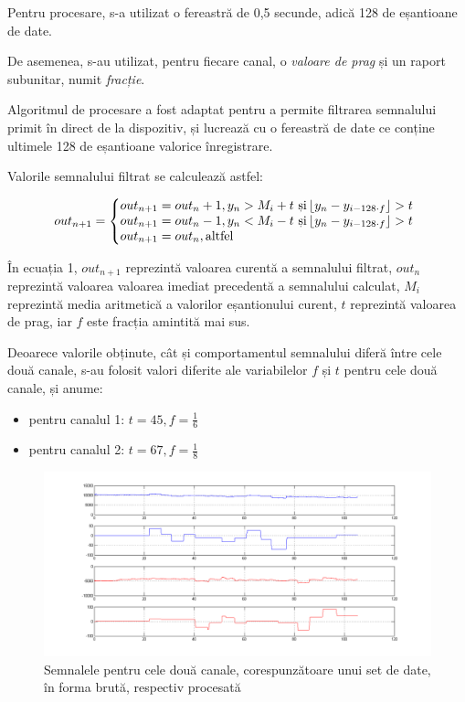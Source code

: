 \documentclass[12pt]{article}
\begin{document}
	\begin{multicols}{2}
	Pentru procesare, s-a utilizat o fereastră de 0,5 secunde, adică 128 de eșantioane de date.
	
	De asemenea, s-au utilizat, pentru fiecare canal, o \textit{valoare de prag} și un raport subunitar, numit \textit{fracție}.
	
	Algoritmul de procesare a fost adaptat pentru a permite filtrarea semnalului primit în direct de la dispozitiv, și lucrează cu o fereastră de date ce conține ultimele 128 de eșantioane valorice înregistrare.
	
	Valorile semnalului filtrat se calculează astfel:
	\end{multicols}
	\begin{equation}
	out_{n+1}=\left\{
	\begin{array}{@{} l c @{}}
	out_{n+1} = out_n + 1, y_n > M_i + t \mbox{ și} \left\lfloor y_n - y_{i-128 \cdot f} \right\rfloor > t\\
	out_{n+1} = out_n - 1, y_n < M_i - t \mbox{ și} \left\lfloor y_n - y_{i-128 \cdot f} \right\rfloor > t\\
	out_{n+1} = out_n, \mbox{altfel}
	\end{array}\right.
	\label{eq4}
	\end{equation}
	\begin{multicols}{2}
	În ecuația 1, $out_{n+1}$ reprezintă valoarea curentă a semnalului filtrat, $out_n$ reprezintă valoarea valoarea imediat precedentă a semnalului calculat, $M_i$ reprezintă media aritmetică a valorilor eșantionului curent, $t$ reprezintă valoarea de prag, iar $f$ este fracția amintită mai sus.
	
	Deoarece valorile obținute, cât și comportamentul semnalului diferă între cele două canale, s-au folosit valori diferite ale variabilelor $f$ și $t$ pentru cele două canale, și anume:
	\begin{itemize}[noitemsep, nolistsep]
		\item pentru canalul 1: $t = 45, f = \frac{1}{6}$
		\item pentru canalul 2: $t = 67, f = \frac{1}{8}$
	\end{itemize}
	\end{multicols}
	
	\begin{figure}[h]
		\caption {Semnalele pentru cele două canale, corespunzătoare unui set de date, în forma brută, respectiv procesată}
		\includegraphics[width=\textwidth]{graph}	
	\end{figure}
	
\end{document}
